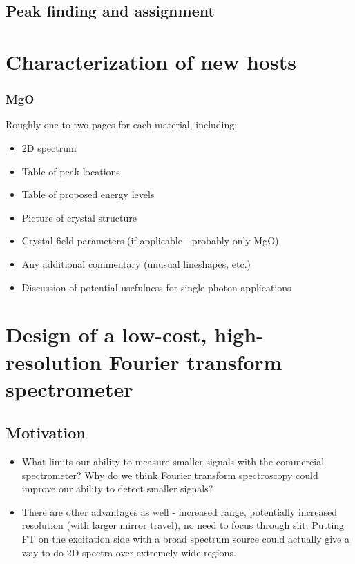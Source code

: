 \documentclass[12pt]{puthesis}
\begin{document}
\section{Peak finding and assignment}



\chapter{Characterization of new hosts}


\subsection{MgO}
\label{sec:mgo}

Roughly one to two pages for each material, including:

\begin{itemize}
\item 2D spectrum

\item Table of peak locations

\item Table of proposed energy levels

\item Picture of crystal structure

\item Crystal field parameters (if applicable - probably only MgO)

\item Any additional commentary (unusual lineshapes, etc.)

\item Discussion of potential usefulness for single photon applications 
\end{itemize}



\chapter{Design of a low-cost, high-resolution Fourier transform spectrometer}

\section{Motivation}

\begin{itemize}
\item What limits our ability to measure smaller signals with the commercial spectrometer? Why do we think Fourier transform spectroscopy could improve our ability to detect smaller signals?

\item There are other advantages as well - increased range, potentially increased resolution (with larger mirror travel), no need to focus through slit. Putting FT on the excitation side with a broad spectrum source could actually give a way to do 2D spectra over extremely wide regions.
\end{itemize}
\end{document}
